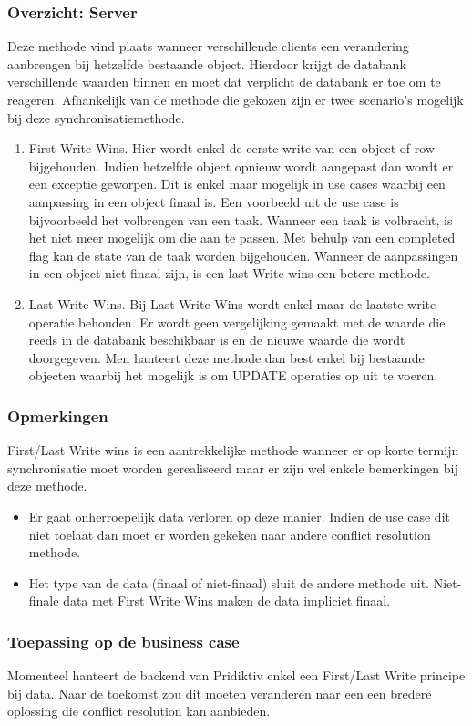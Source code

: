 \subsubsection{Overzicht: Server}
Deze methode vind plaats wanneer verschillende clients een verandering aanbrengen bij hetzelfde bestaande object. Hierdoor krijgt de databank verschillende waarden binnen en moet dat verplicht de databank er toe om te reageren. Afhankelijk van de methode die gekozen zijn er twee scenario's mogelijk bij deze synchronisatiemethode.
\begin{enumerate}
\item First Write Wins. Hier wordt enkel de eerste write van een object of row bijgehouden. Indien hetzelfde object opnieuw wordt aangepast dan wordt er een exceptie geworpen. Dit is enkel maar mogelijk in use cases waarbij een aanpassing in een object finaal is. Een voorbeeld uit de use case is bijvoorbeeld het volbrengen van een taak. Wanneer een taak is volbracht, is het niet meer mogelijk om die aan te passen. Met behulp van een completed flag kan de state van de taak worden bijgehouden. Wanneer de aanpassingen in een object niet finaal zijn, is een last Write wins een betere methode.
\item Last Write Wins. Bij Last Write Wins wordt enkel maar de laatste write operatie behouden. Er wordt geen vergelijking gemaakt met de waarde die reeds in de databank beschikbaar is en de nieuwe waarde die wordt doorgegeven. Men hanteert deze methode dan best enkel bij bestaande objecten waarbij het mogelijk is om UPDATE operaties op uit te voeren.
\end{enumerate}
\subsubsection{Opmerkingen}
First/Last Write wins is een aantrekkelijke methode wanneer er op korte termijn synchronisatie moet worden gerealiseerd maar er zijn wel enkele bemerkingen bij deze methode.
\begin{itemize}
\item Er gaat onherroepelijk data verloren op deze manier. Indien de use case dit niet toelaat dan moet er worden gekeken naar andere conflict resolution methode.
\item Het type van de data (finaal of niet-finaal) sluit de andere methode uit. Niet-finale data met First Write Wins maken de data impliciet finaal.
\end{itemize}
\subsubsection{Toepassing op de business case}
Momenteel hanteert de backend van Pridiktiv enkel een First/Last Write principe bij data. Naar de toekomst zou dit moeten veranderen naar een een bredere oplossing die conflict resolution kan aanbieden.

